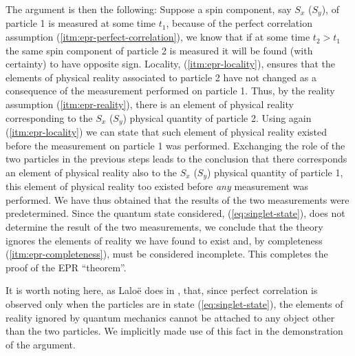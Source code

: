 The argument is then the following: Suppose a spin component, say $S_x$ ($S_y$), of particle 1 is measured at some time $t_1$, because of the perfect correlation assumption (\ref{itm:epr-perfect-correlation}), we know that if at some time $t_2 > t_1$ the same spin component of particle 2 is measured it will be found (with certainty) to have opposite sign. Locality, (\ref{itm:epr-locality}), ensures that the elements of physical reality associated to particle 2 have not changed as a consequence of the measurement performed on particle 1. Thus, by the reality assumption (\ref{itm:epr-reality}), there is an element of physical reality corresponding to the $S_x$ ($S_y$) physical quantity of particle 2. Using again (\ref{itm:epr-locality}) we can state that such element of physical reality existed before the measurement on particle 1 was performed. Exchanging the role of the two particles in the previous steps leads to the conclusion that there corresponds an element of physical reality also to the $S_x$ ($S_y$) physical quantity of particle 1, this element of physical reality too existed before \textit{any} measurement was performed. We have thus obtained that the results of the two measurements were predetermined. Since the quantum state considered, (\ref{eq:singlet-state}), does not determine the result of the two measurements, we conclude that the theory ignores the elements of reality we have found to exist and, by completeness (\ref{itm:epr-completeness}), must be considered incomplete. This completes the proof of the EPR ``theorem''.%

\begin{remark}
  It is worth noting here, as Laloë does in \cite{:/content/aapt/journal/ajp/69/6/10.1119/1.1356698}, that, since perfect correlation is observed only when the particles are in state (\ref{eq:singlet-state}), the elements of reality ignored by quantum mechanics cannot be attached to any object other than the two particles. We implicitly made use of this fact in the demonstration of the argument.
\end{remark}

